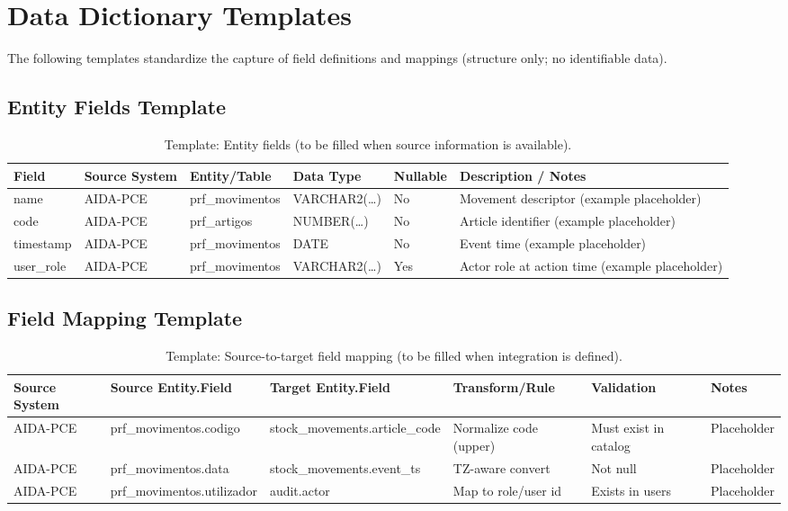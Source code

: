 \section{Data Dictionary Templates}
The following templates standardize the capture of field definitions and mappings (structure only; no identifiable data).

\subsection{Entity Fields Template}
\begin{table}[H]
    \centering
    \caption{Template: Entity fields (to be filled when source information is available).}
    \label{tab:template_entity_fields}
    \begin{tabularx}{\textwidth}{@{}l l l l l X@{}}
        \toprule
        \textbf{Field} & \textbf{Source System} & \textbf{Entity/Table} & \textbf{Data Type} & \textbf{Nullable} & \textbf{Description / Notes} \\
        \midrule
        name & AIDA-PCE & prf\_movimentos & VARCHAR2(…) & No & Movement descriptor (example placeholder) \\
        code & AIDA-PCE & prf\_artigos & NUMBER(…) & No & Article identifier (example placeholder) \\
        timestamp & AIDA-PCE & prf\_movimentos & DATE & No & Event time (example placeholder) \\
        user\_role & AIDA-PCE & prf\_movimentos & VARCHAR2(…) & Yes & Actor role at action time (example placeholder) \\
        \bottomrule
    \end{tabularx}
\end{table}

\subsection{Field Mapping Template}
\begin{table}[H]
    \centering
    \caption{Template: Source-to-target field mapping (to be filled when integration is defined).}
    \label{tab:template_field_mapping}
    \begin{tabularx}{\textwidth}{@{}l l l l l X@{}}
        \toprule
        \textbf{Source System} & \textbf{Source Entity.Field} & \textbf{Target Entity.Field} & \textbf{Transform/Rule} & \textbf{Validation} & \textbf{Notes} \\
        \midrule
        AIDA-PCE & prf\_movimentos.codigo & stock\_movements.article\_code & Normalize code (upper) & Must exist in catalog & Placeholder \\
        AIDA-PCE & prf\_movimentos.data & stock\_movements.event\_ts & TZ-aware convert & Not null & Placeholder \\
        AIDA-PCE & prf\_movimentos.utilizador & audit.actor & Map to role/user id & Exists in users & Placeholder \\
        \bottomrule
    \end{tabularx}
\end{table}

